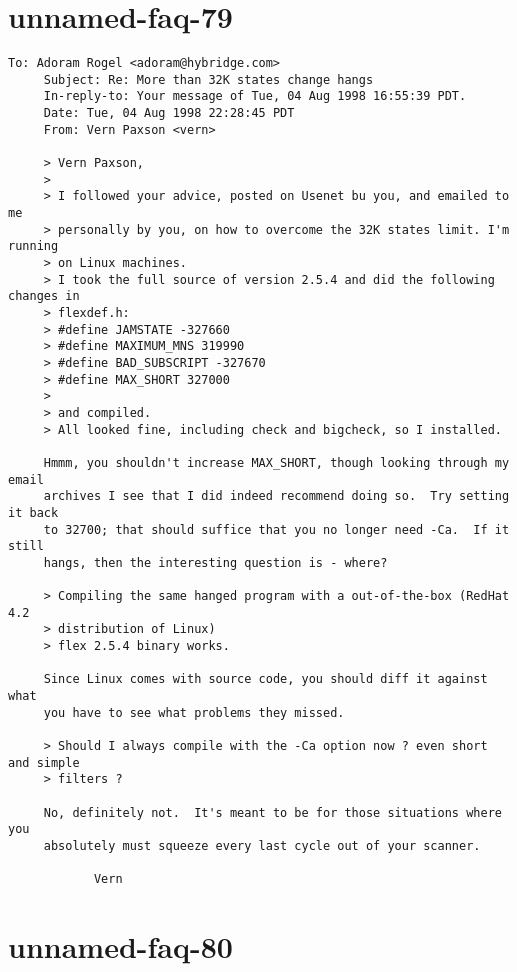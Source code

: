 \documentclass[openany,oneside]{book}
\begin{document}
\section{unnamed-faq-79}

\begin{verbatim}
To: Adoram Rogel <adoram@hybridge.com>
     Subject: Re: More than 32K states change hangs
     In-reply-to: Your message of Tue, 04 Aug 1998 16:55:39 PDT.
     Date: Tue, 04 Aug 1998 22:28:45 PDT
     From: Vern Paxson <vern>
     
     > Vern Paxson,
     >
     > I followed your advice, posted on Usenet bu you, and emailed to me
     > personally by you, on how to overcome the 32K states limit. I'm running
     > on Linux machines.
     > I took the full source of version 2.5.4 and did the following changes in
     > flexdef.h:
     > #define JAMSTATE -327660
     > #define MAXIMUM_MNS 319990
     > #define BAD_SUBSCRIPT -327670
     > #define MAX_SHORT 327000
     >
     > and compiled.
     > All looked fine, including check and bigcheck, so I installed.
     
     Hmmm, you shouldn't increase MAX_SHORT, though looking through my email
     archives I see that I did indeed recommend doing so.  Try setting it back
     to 32700; that should suffice that you no longer need -Ca.  If it still
     hangs, then the interesting question is - where?
     
     > Compiling the same hanged program with a out-of-the-box (RedHat 4.2
     > distribution of Linux)
     > flex 2.5.4 binary works.
     
     Since Linux comes with source code, you should diff it against what
     you have to see what problems they missed.
     
     > Should I always compile with the -Ca option now ? even short and simple
     > filters ?
     
     No, definitely not.  It's meant to be for those situations where you
     absolutely must squeeze every last cycle out of your scanner.
     
     		Vern
\end{verbatim}

\section{unnamed-faq-80}
\end{document}
